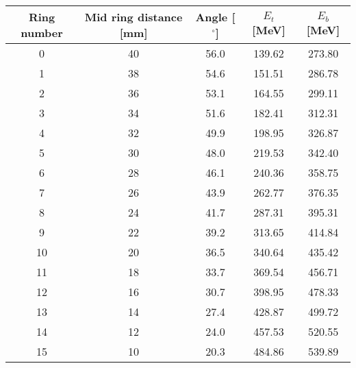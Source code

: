 \begin{tabular}{ccccc}
\hline
Ring number  &  Mid ring distance [mm]  &  Angle [$^\circ$]  &  $E_t$ [MeV]  &  $E_b$ [MeV]  \\
\hline
0            &  40                      &  56.0              &  139.62       &  273.80       \\
1            &  38                      &  54.6              &  151.51       &  286.78       \\
2            &  36                      &  53.1              &  164.55       &  299.11       \\
3            &  34                      &  51.6              &  182.41       &  312.31       \\
4            &  32                      &  49.9              &  198.95       &  326.87       \\
5            &  30                      &  48.0              &  219.53       &  342.40       \\
6            &  28                      &  46.1              &  240.36       &  358.75       \\
7            &  26                      &  43.9              &  262.77       &  376.35       \\
8            &  24                      &  41.7              &  287.31       &  395.31       \\
9            &  22                      &  39.2              &  313.65       &  414.84       \\
10           &  20                      &  36.5              &  340.64       &  435.42       \\
11           &  18                      &  33.7              &  369.54       &  456.71       \\
12           &  16                      &  30.7              &  398.95       &  478.33       \\
13           &  14                      &  27.4              &  428.87       &  499.72       \\
14           &  12                      &  24.0              &  457.53       &  520.55       \\
15           &  10                      &  20.3              &  484.86       &  539.89       \\
\hline
\end{tabular}